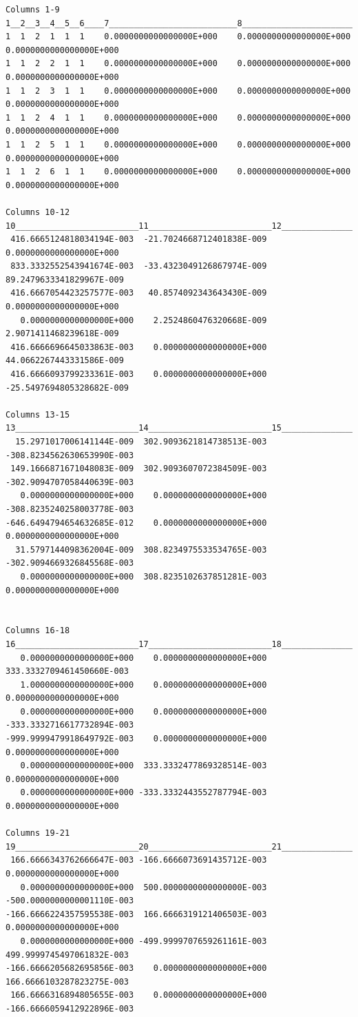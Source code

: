 \documentclass[a4]{article}
\begin{document}
\begin{Verbatim}
Columns 1-9
1__2__3__4__5__6____7__________________________8__________________________9_______________________
1  1  2  1  1  1    0.0000000000000000E+000    0.0000000000000000E+000    0.0000000000000000E+000 
1  1  2  2  1  1    0.0000000000000000E+000    0.0000000000000000E+000    0.0000000000000000E+000 
1  1  2  3  1  1    0.0000000000000000E+000    0.0000000000000000E+000    0.0000000000000000E+000
1  1  2  4  1  1    0.0000000000000000E+000    0.0000000000000000E+000    0.0000000000000000E+000
1  1  2  5  1  1    0.0000000000000000E+000    0.0000000000000000E+000    0.0000000000000000E+000  
1  1  2  6  1  1    0.0000000000000000E+000    0.0000000000000000E+000    0.0000000000000000E+000  

Columns 10-12
10_________________________11_________________________12_________________________
 416.6665124818034194E-003  -21.7024668712401838E-009    0.0000000000000000E+000  
 833.3332552543941674E-003  -33.4323049126867974E-009   89.2479633341829967E-009  
 416.6667054423257577E-003   40.8574092343643430E-009    0.0000000000000000E+000   
   0.0000000000000000E+000    2.2524860476320668E-009    2.9071411468239618E-009 
 416.6666696645033863E-003    0.0000000000000000E+000   44.0662267443331586E-009   
 416.6666093799233361E-003    0.0000000000000000E+000  -25.5497694805328682E-009    

Columns 13-15
13_________________________14_________________________15_________________________
  15.2971017006141144E-009  302.9093621814738513E-003 -308.8234562630653990E-003    
 149.1666871671048083E-009  302.9093607072384509E-003 -302.9094707058440639E-003    
   0.0000000000000000E+000    0.0000000000000000E+000 -308.8235240258003778E-003  
-646.6494794654632685E-012    0.0000000000000000E+000    0.0000000000000000E+000 
  31.5797144098362004E-009  308.8234975533534765E-003 -302.9094669326845568E-003   
   0.0000000000000000E+000  308.8235102637851281E-003    0.0000000000000000E+000    


Columns 16-18
16_________________________17_________________________18_________________________
   0.0000000000000000E+000    0.0000000000000000E+000  333.3332709461450660E-003  
   1.0000000000000000E+000    0.0000000000000000E+000    0.0000000000000000E+000    
   0.0000000000000000E+000    0.0000000000000000E+000 -333.3332716617732894E-003 
-999.9999479918649792E-003    0.0000000000000000E+000    0.0000000000000000E+000    
   0.0000000000000000E+000  333.3332477869328514E-003    0.0000000000000000E+000 
   0.0000000000000000E+000 -333.3332443552787794E-003    0.0000000000000000E+000  
  
Columns 19-21
19_________________________20_________________________21_________________________
 166.6666343762666647E-003 -166.6666073691435712E-003    0.0000000000000000E+000
   0.0000000000000000E+000  500.0000000000000000E-003 -500.0000000000001110E-003
-166.6666224357595538E-003  166.6666319121406503E-003    0.0000000000000000E+000
   0.0000000000000000E+000 -499.9999707659261161E-003  499.9999745497061832E-003
-166.6666205682695856E-003    0.0000000000000000E+000  166.6666103287823275E-003
 166.6666316894805655E-003    0.0000000000000000E+000 -166.6666059412922896E-003
\end{Verbatim}
\end{document}
